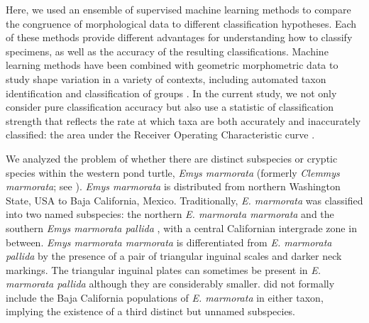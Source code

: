 \documentclass[12pt,letterpaper]{article}
\begin{document}
Here, we used an ensemble of supervised machine learning methods to compare the congruence of morphological data to different classification hypotheses. Each of these methods provide different advantages for understanding how to classify specimens, as well as the accuracy of the resulting classifications. 
Machine learning methods have been combined with geometric morphometric data to study shape variation in a variety of contexts, including automated taxon identification and classification of groups \citep{Baylac2003,Dobigny2003,MacLeod2007,VanBocxlaer2010,VandenBrink2011,Navega2015}. %
In the current study, we not only consider pure classification accuracy but also use a statistic of classification strength that reflects the rate at which taxa are both accurately and inaccurately classified: the area under the Receiver Operating Characteristic curve \citep{Hastie2009}. 

We analyzed the problem of whether there are distinct subspecies or cryptic species within the western pond turtle, \textit{Emys marmorata} \citep{Baird1852} (formerly \emph{Clemmys marmorata}; see \citealp{Feldman2002}). \textit{Emys marmorata} is distributed from northern Washington State, USA to Baja California, Mexico. Traditionally, \textit{E. marmorata} was classified into two named subspecies: the northern \textit{E. marmorata marmorata} and the southern \textit{Emys marmorata pallida} \citep{Seeliger1945}, with a central Californian intergrade zone in between. \textit{Emys marmorata marmorata} is differentiated from \textit{E. marmorata pallida} by the presence of a pair of triangular inguinal scales and darker neck markings. The triangular inguinal plates can sometimes be present in \textit{E. marmorata pallida} although they are considerably smaller. \citet{Seeliger1945} did not formally include the Baja California populations of \textit{E. marmorata} in either taxon, implying the existence of a third distinct but unnamed subspecies.
\end{document}
